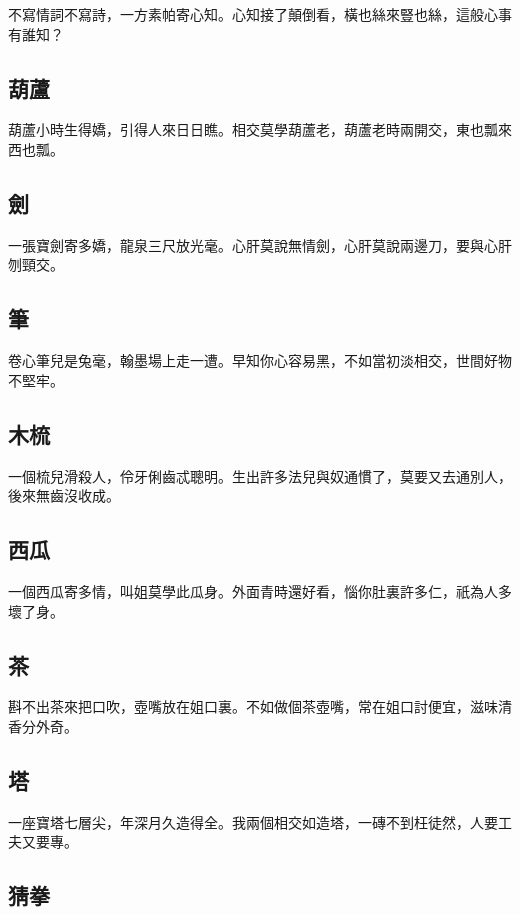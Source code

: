 不寫情詞不寫詩，一方素帕寄心知。心知接了顛倒看，橫也絲來豎也絲，這般心事有誰知？

\subsection*{葫蘆}

葫蘆小時生得嬌，引得人來日日瞧。相交莫學葫蘆老，葫蘆老時兩開交，東也瓢來西也瓢。

\subsection*{劍}

一張寶劍寄多嬌，龍泉三尺放光毫。心肝莫說無情劍，心肝莫說兩邊刀，要與心肝刎頸交。

\subsection*{筆}

卷心筆兒是兔毫，翰墨場上走一遭。早知你心容易黑，不如當初淡相交，世間好物不堅牢。

\subsection*{木梳}

一個梳兒滑殺人，伶牙俐齒忒聰明。生出許多法兒與奴通慣了，莫要又去通別人，後來無齒沒收成。

\subsection*{西瓜}

一個西瓜寄多情，叫姐莫學此瓜身。外面青時還好看，惱你肚裏許多仁，祇為人多壞了身。

\subsection*{茶}

斟不出茶來把口吹，壺嘴放在姐口裏。不如做個茶壺嘴，常在姐口討便宜，滋味清香分外奇。

\subsection*{塔}

一座寶塔七層尖，年深月久造得全。我兩個相交如造塔，一磚不到枉徒然，人要工夫又要專。

\subsection*{猜拳}

